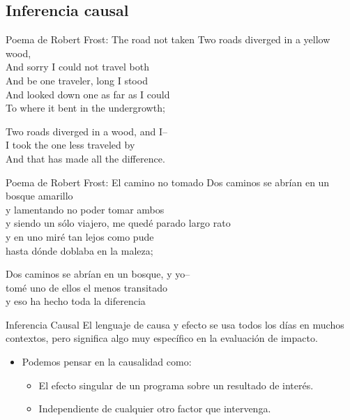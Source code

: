 \documentclass[11pt, aspectratio=169, compress]{beamer}
\begin{document}
\subsection{Inferencia causal}
\begin{frame}{Poema de Robert Frost: The road not taken}
Two roads diverged in a yellow wood, \\
And sorry I could not travel both\\
And be one traveler, long I stood\\
And looked down one as far as I could\\
To where it bent in the undergrowth; 


Two roads diverged in a wood, and I--\\
I took the one less traveled by \\
And that has made all the difference. 

\end{frame}
\begin{frame}{Poema de Robert Frost: El camino no tomado}
Dos caminos se abrían en un bosque amarillo	\\
y lamentando no poder tomar ambos		\\
y siendo un sólo viajero, me quedé parado largo rato	\\
y en uno miré tan lejos como pude	\\
hasta dónde doblaba en la maleza;


Dos caminos se abrían en un bosque, y yo-- \\ 
tomé uno de ellos el menos transitado \\ 
y eso ha hecho toda la diferencia	
	
\end{frame}
\begin{frame}{Inferencia Causal}
El lenguaje de causa y efecto se usa todos los días en muchos
contextos, pero significa algo muy específico en la evaluación de impacto.

\begin{itemize}
\item Podemos pensar en la causalidad como: 
\begin{itemize}
	\item El efecto singular de un programa sobre un resultado de interés.
	\item Independiente de cualquier otro factor que intervenga.
\end{itemize}
\end{itemize}
\end{frame}
\end{document}
